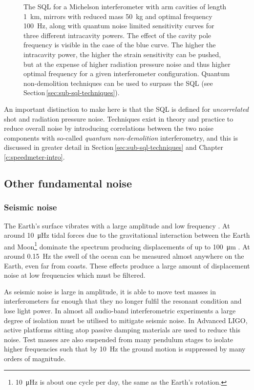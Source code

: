 \begin{figure}
  \centering
  
  \caption[Standard quantum limit and quantum noise with various input powers]{\label{fig:sql-vs-input-power}The \gls{SQL} for a Michelson interferometer with arm cavities of length \SI{1}{\kilo\meter}, mirrors with reduced mass \SI{50}{\kilo\gram} and optimal frequency \SI{100}{\hertz}, along with quantum noise limited sensitivity curves for three different intracavity powers. The effect of the cavity pole frequency is visible in the case of the blue curve. The higher the intracavity power, the higher the strain sensitivity can be pushed, but at the expense of higher radiation pressure noise and thus higher optimal frequency for a given interferometer configuration. Quantum non-demolition techniques can be used to surpass the \gls{SQL} (see Section\,\ref{sec:sub-sql-techniques}).}
\end{figure}

An important distinction to make here is that the \gls{SQL} is defined for \emph{uncorrelated} shot and radiation pressure noise. Techniques exist in theory and practice to reduce overall noise by introducing correlations between the two noise components with so-called \emph{quantum non-demolition} interferometry, and this is discussed in greater detail in Section\,\ref{sec:sub-sql-techniques} and Chapter\,\ref{c:speedmeter-intro}.

\subsection{Other fundamental noise}

\subsubsection{\label{sec:seismic-noise}Seismic noise}
The Earth's surface vibrates with a large amplitude and low frequency \cite{ET2011}. At around \SI{10}{\micro\hertz} tidal forces due to the gravitational interaction between the Earth and Moon\footnote{\SI{10}{\micro\hertz} is about one cycle per day, the same as the Earth's rotation.} dominate the spectrum producing displacements of up to \SI{100}{\micro\meter} \cite{Adhikari2004}. At around \SI{0.15}{\hertz} the swell of the ocean can be measured almost anywhere on the Earth, even far from coasts. These effects produce a large amount of displacement noise at low frequencies which must be filtered.

As seismic noise is large in amplitude, it is able to move test masses in interferometers far enough that they no longer fulfil the resonant condition and lose light power. In almost all audio-band interferometric experiments a large degree of isolation must be utilised to mitigate seismic noise. In Advanced \gls{LIGO}, active platforms sitting atop passive damping materials are used to reduce this noise. Test masses are also suspended from many pendulum stages to isolate higher frequencies such that by \SI{10}{\hertz} the ground motion is suppressed by many orders of magnitude.

